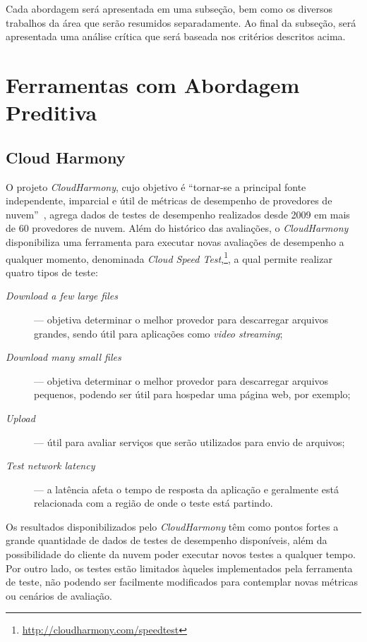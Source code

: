Cada abordagem será apresentada em uma subseção, bem como os diversos trabalhos da área que serão resumidos separadamente. Ao final da subseção, será apresentada uma análise crítica que será baseada nos critérios descritos acima.

\section{Ferramentas com Abordagem Preditiva}
\subsection{Cloud Harmony}
O projeto {\em CloudHarmony}, cujo
objetivo é ``tornar-se a principal fonte independente, imparcial e útil de
métricas de desempenho de provedores de nuvem''~\cite{cloudharmony}, agrega
dados de testes de desempenho realizados desde 2009 em mais de 60 provedores de
nuvem. Além do histórico das avaliações, o {\em CloudHarmony} disponibiliza uma ferramenta para executar novas avaliações de desempenho a qualquer momento, denominada
\textit{Cloud Speed Test},\footnote{\url{http://cloudharmony.com/speedtest}}, a qual permite realizar quatro tipos de teste:

\begin{description}
  \item[\em Download a few large files] --- objetiva determinar o melhor provedor
  para descarregar arquivos grandes, sendo útil para aplicações como {\em video
  streaming};
  \item[\em Download many small files] --- objetiva determinar o melhor provedor
  para descarregar arquivos pequenos, podendo ser útil para hospedar uma página
  web, por exemplo;
  \item[\em Upload] --- útil para avaliar serviços que serão utilizados para
  envio de arquivos;
  \item[\em Test network latency] --- a latência afeta o tempo de resposta da
  aplicação e geralmente está relacionada com a região de onde o teste está
  partindo.
\end{description}

Os resultados disponibilizados pelo {\em CloudHarmony} têm como pontos fortes a
grande quantidade de dados de testes de desempenho disponíveis, além da possibilidade do cliente da
nuvem poder executar novos testes a qualquer tempo. Por outro lado, os testes estão limitados àqueles implementados pela ferramenta de teste, não podendo ser facilmente modificados para contemplar novas métricas ou cenários de avaliação.

